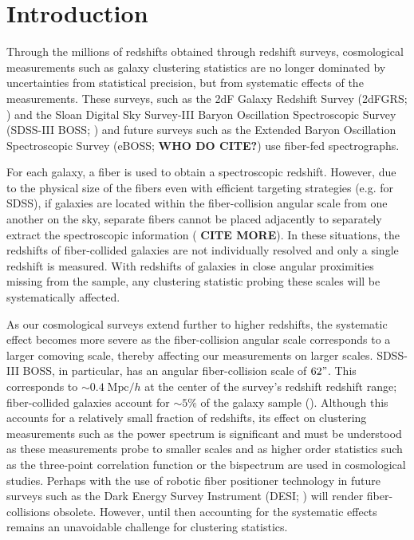 \documentclass{emulateapj}
\begin{document}
\section{Introduction} 
Through the millions of redshifts obtained through redshift surveys, cosmological measurements such as galaxy clustering statistics are no longer dominated by uncertainties from statistical precision, but from systematic effects of the measurements. These surveys, such as the 2dF Galaxy Redshift Survey (2dFGRS; \citealt{Colless:1999aa}) and the Sloan Digital Sky Survey-III Baryon Oscillation Spectroscopic Survey (SDSS-III BOSS; \citealt{Anderson:2012aa, Dawson:2013aa}) and future surveys such as the Extended Baryon Oscillation Spectroscopic Survey (eBOSS; {\bf WHO DO CITE?}) use fiber-fed spectrographs. 

For each galaxy, a fiber is used to obtain a spectroscopic redshift. However, due to the physical size of the fibers even with efficient targeting strategies (e.g. \citealt{Blanton:2003ab} for SDSS), if galaxies are located within the fiber-collision angular scale from one another on the sky, separate fibers cannot be placed adjacently to separately extract the spectroscopic information (\citealt{Yoon:2008aa} {\bf CITE MORE}). In these situations, the redshifts of fiber-collided galaxies are not individually resolved and only a single redshift is measured. With redshifts of galaxies in close angular proximities missing from the sample, any clustering statistic probing these scales will be systematically affected. 

As our cosmological surveys extend further to higher redshifts, the systematic effect becomes more severe as the fiber-collision angular scale corresponds to a larger comoving scale, thereby affecting our measurements on larger scales. SDSS-III BOSS, in particular, has an angular fiber-collision scale of $62"$. This corresponds to $\sim 0.4 \;\mathrm{Mpc}/h$ at the center of the survey's redshift redshift range; fiber-collided galaxies account for $\sim 5\%$ of the galaxy sample (\citealt{Anderson:2012aa}). Although this accounts for a relatively small fraction of redshifts, its effect on clustering measurements such as the power spectrum is significant and must be understood as these measurements probe to smaller scales and as higher order statistics such as the three-point correlation function or the bispectrum are used in cosmological studies. Perhaps with the use of robotic fiber positioner technology in future surveys such as the Dark Energy Survey Instrument (DESI; \citealt{Schlegel:2011aa, Morales:2012aa, Makarem:2014aa}) will render fiber-collisions obsolete. However, until then accounting for the systematic effects remains an unavoidable challenge for clustering statistics. 
\end{document}
